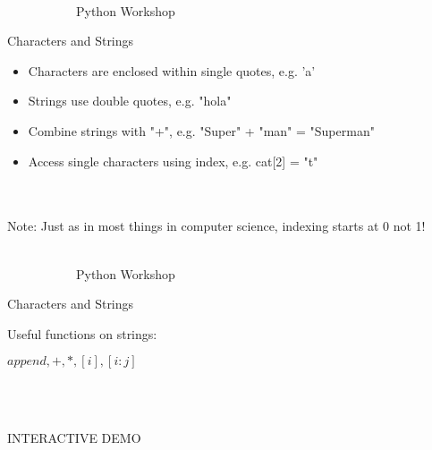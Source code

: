 \documentclass[10pt, xcolor=dvisnames]{beamer}
\begin{document}
\begin{frame}{{\tiny \ \\\vspace{-13pt} \ \ \ \ \ \ \ \ \ \ \ Python Workshop}\\ \centerline{Characters and Strings}}
\vspace*{-50pt}


\begin{itemize}
\item Characters are enclosed within single quotes, e.g. 'a'
\item Strings use double quotes, e.g. "hola"
\item Combine strings with "+", e.g. "Super" + "man" = "Superman"
\item Access single characters using index, e.g. cat[2] = "t"
\end{itemize}



\ \\
\ \\
{\small Note: Just as in most things in computer science, indexing starts at 0 not 1!}

\end{frame}





\begin{frame}{{\tiny \ \\\vspace{-13pt} \ \ \ \ \ \ \ \ \ \ \ Python Workshop}\\ \centerline{Characters and Strings}}
\vspace*{-50pt}

Useful functions on strings:\\

\centerline{$append, +, *, [i], [i:j]$}

\ \\
\ \\
\centerline{INTERACTIVE DEMO}

\end{frame}
\end{document}
